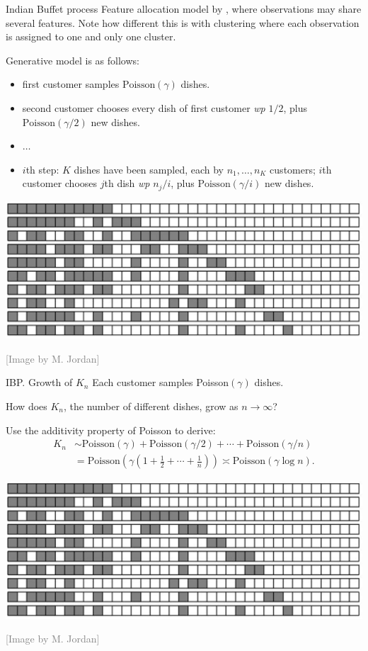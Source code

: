 \begin{frame}{Indian Buffet process}
	\alert{Feature allocation model} by  \citet{ghahramani2006infinite}, where observations may share \alert{several features}. Note how different this is with \alert{clustering} where each observation is assigned to \alert{one and only one cluster}. 
	
	\pause 	\alert{Generative model} is as follows: \pause
	\begin{itemize}[<+->]
		\item first customer samples $\text{Poisson}(\gamma)$ dishes.
		\item second customer chooses every dish of first customer \textit{wp} $1/2$, plus  $\text{Poisson}(\gamma/2)$ new dishes.
		\item $\ldots$
		\item $i$th step: $K$ dishes have been sampled, each by $n_1,\ldots,n_K$ customers;  $i$th customer chooses $j$th dish  \textit{wp} $n_j/i$, plus  $\text{Poisson}(\gamma/i)$ new dishes.
	\end{itemize}
	
\begin{center}
		\includegraphics[width=.7\textwidth]{figures_julyan/beyond_DP/IBP_draw}
		\end{center}
		\hfill\textcolor{gray}{[Image by M. Jordan]}
\end{frame}


\begin{frame}{IBP. Growth of $K_n$}
Each customer samples Poisson$(\gamma)$ dishes.\pause

How does \alert{$K_n$}, the number of different dishes, \alert{grow as $n\to\infty$?}\pause 

Use the \alert{additivity} property of Poisson to derive:
\begin{align*}
	K_n&\sim 
	\text{Poisson}(\gamma)+\text{Poisson}(\gamma/2)+\cdots+\text{Poisson}(\gamma/n)\\
	&=
	\text{Poisson}\left (\gamma\left(1+\frac{1}{2}+\cdots+\frac{1}{n}\right)\right)
	\asymp
	\text{Poisson}(\gamma\log n).
\end{align*}
	
\begin{center}
		\includegraphics[width=.7\textwidth]{figures_julyan/beyond_DP/IBP_draw}
		\end{center}
		\hfill\textcolor{gray}{[Image by M. Jordan]}
\end{frame}


